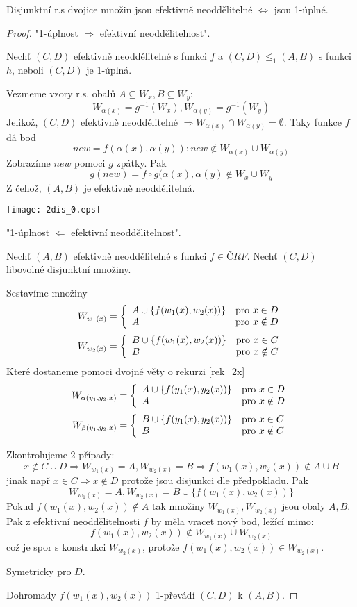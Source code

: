 \begin{theorem}
	Disjunktní r.s dvojice množin jsou efektivně neoddělitelné $\iff$ jsou 1-úplné.
\end{theorem}
\begin{proof}
	"1-úplnost $\Rightarrow$ efektivní neoddělitelnost".

	Nechť $(C, D)$ efektivně neoddělitelné s funkci $f$ a $(C, D) \leq_1 (A, B)$ s funkci $h$, neboli $(C, D)$ je 1-úplná.

	Vezmeme vzory r.s. obalů $A \subseteq W_x, B \subseteq W_y$:
	\[ W_{\alpha(x)} = g^{-1}(W_x), W_{\alpha(y)} = g^{-1}(W_y) \]
	Jelikož, $(C, D)$ efektivně neoddělitelné $\Rightarrow W_{\alpha(x)} \cap W_{\alpha(y)} = \emptyset$.
	Taky funkce $f$ dá bod
	\[ new = f(\alpha(x), \alpha(y)): new \notin W_{\alpha(x)} \cup W_{\alpha(y)} \]
	Zobrazíme $new$ pomoci $g$ zpátky. Pak
	\[ g(new) = f \circ g(\alpha(x), \alpha(y) \notin W_x \cup W_y\]
	Z čehož, $(A, B)$ je efektivně neoddělitelná.

\texttt{[image: 2dis\_0.eps]}

	"1-úplnost $\Leftarrow$ efektivní neoddělitelnost".

	Nechť $(A, B)$ efektivně neoddělitelné s funkci $f \in ČRF$.
	Nechť $(C, D)$ libovolné disjunktní množiny.

	Sestavíme množiny
	\[ W_{w_1(x)} = \left\{ \begin{array}{ll}  A \cup \{ f(w_1(x), w_2(x)) \}  & \mbox{pro }  x \in D  \\  A  & \mbox{pro }  x \notin D  \end{array} \right. \]
	\[ W_{w_2(x)} = \left\{ \begin{array}{ll}  B \cup \{ f(w_1(x), w_2(x)) \}  & \mbox{pro }  x \in C  \\  B  & \mbox{pro }  x \notin C  \end{array} \right. \]
	Které dostaneme pomoci dvojné věty o rekurzi \cref{rek_2x}
	\[ W_{\alpha(y_1, y_2, x)} = \left\{ \begin{array}{ll}  A \cup \{ f(y_1(x), y_2(x)) \}  & \mbox{pro }  x \in D  \\  A  & \mbox{pro }  x \notin D  \end{array} \right. \]
	\[ W_{\beta(y_1, y_2, x)} = \left\{ \begin{array}{ll}  B \cup \{ f(y_1(x), y_2(x)) \}  & \mbox{pro }  x \in C  \\  B  & \mbox{pro }  x \notin C  \end{array} \right. \]


	Zkontrolujeme 2 případy:
	\[ x \notin C \cup D \Rightarrow W_{w_1(x)} = A, W_{w_2(x)} = B \Rightarrow f(w_1(x), w_2(x)) \notin A \cup B \]
	jinak např $x \in C \Rightarrow x \notin D$ protože jsou disjunkci dle předpokladu.
	Pak
	\[ W_{w_1(x)} = A, W_{w_2(x)} = B \cup \{ f(w_1(x), w_2(x)) \} \]
	Pokud $f(w_1(x), w_2(x)) \notin A$ tak množiny $W_{w_1(x)}, W_{w_2(x)}$ jsou obaly $A, B$.
	Pak z efektivní neoddělitelnosti $f$ by měla vracet nový bod, ležící mimo:
	\[ f(w_1(x), w_2(x)) \notin W_{w_1(x)} \cup W_{w_2(x)} \]
	což je spor s konstrukci $W_{w_2(x)}$, protože $f(w_1(x), w_2(x)) \in W_{w_2(x)}$.

	Symetricky pro $D$.

	Dohromady $f(w_1(x), w_2(x))$ 1-převádí $(C, D)$ k $(A, B)$.
\end{proof}
